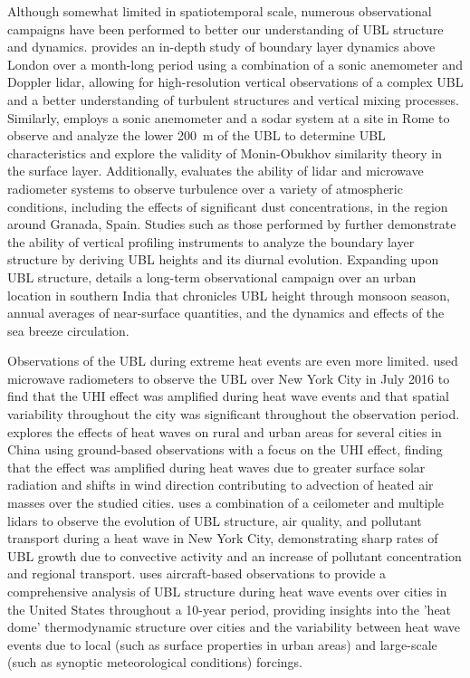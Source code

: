 \documentclass[num-refs]{wiley-article}
\begin{document}
Although somewhat limited in spatiotemporal scale, numerous observational campaigns have been performed to better our understanding of UBL structure and dynamics. \citet{barlow2011} provides an in-depth study of boundary layer dynamics above London over a month-long period using a combination of a sonic anemometer and Doppler lidar, allowing for high-resolution vertical observations of a complex UBL and a better understanding of turbulent structures and vertical mixing processes. Similarly, \citet{pelliccioni2012} employs a sonic anemometer and a sodar system at a site in Rome to observe and analyze the lower \SI{200}{\meter} of the UBL to determine UBL characteristics and explore the validity of Monin-Obukhov similarity theory in the surface layer. Additionally, \citet{dearrudamoreira2020} evaluates the ability of lidar and microwave radiometer systems to observe turbulence over a variety of atmospheric conditions, including the effects of significant dust concentrations, in the region around Granada, Spain. Studies such as those performed by \citet{banks2015, quan2013, wang2012} further demonstrate the ability of vertical profiling instruments to analyze the boundary layer structure by deriving UBL heights and its diurnal evolution. Expanding upon UBL structure, \citet{anurose2018} details a long-term observational campaign over an urban location in southern India that chronicles UBL height through monsoon season, annual averages of near-surface quantities, and the dynamics and effects of the sea breeze circulation. 

Observations of the UBL during extreme heat events are even more limited. \citet{ramamurthy2017a} used microwave radiometers to observe the UBL over New York City in July 2016 to find that the UHI effect was amplified during heat wave events and that spatial variability throughout the city was significant throughout the observation period. \citet{jiang2019} explores the effects of heat waves on rural and urban areas for several cities in China using ground-based observations with a focus on the UHI effect, finding that the effect was amplified during heat waves due to greater surface solar radiation and shifts in wind direction contributing to advection of heated air masses over the studied cities. \citep{wu2019} uses a combination of a ceilometer and multiple lidars to observe the evolution of UBL structure, air quality, and pollutant transport during a heat wave in New York City, demonstrating sharp rates of UBL growth due to convective activity and an increase of pollutant concentration and regional transport. \citet{zhang2020} uses aircraft-based observations to provide a comprehensive analysis of UBL structure during heat wave events over cities in the United States throughout a 10-year period, providing insights into the 'heat dome' thermodynamic structure over cities and the variability between heat wave events due to local (such as surface properties in urban areas) and large-scale (such as synoptic meteorological conditions) forcings. 
\end{document}
